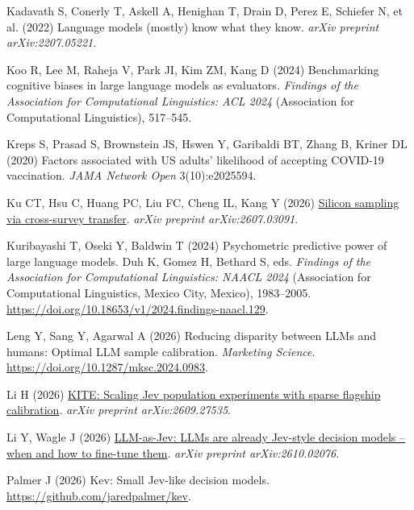 \documentclass[
  letterpaper,
  DIV=11,
  numbers=noendperiod]{scrartcl}
\newlength{\cslhangindent}
\newenvironment{CSLReferences}[2] %
 {\begin{list}{}{%
  \setlength{\itemindent}{0pt}
  \setlength{\leftmargin}{0pt}
  \setlength{\parsep}{0pt}
  \ifodd #1
   \setlength{\leftmargin}{\cslhangindent}
   \setlength{\itemindent}{-1\cslhangindent}
  \fi
  \setlength{\itemsep}{#2\baselineskip}}}
 {\end{list}}
\begin{document}
\begin{CSLReferences}{1}{0}
{Kadavath S, Conerly T, Askell A, Henighan T, Drain D, Perez E, Schiefer
N, et al.} (2022) Language models (mostly) know what they know.
\emph{arXiv preprint arXiv:2207.05221}.

Koo R, Lee M, Raheja V, Park JI, Kim ZM, Kang D (2024) Benchmarking
cognitive biases in large language models as evaluators. \emph{Findings
of the {Association for Computational Linguistics}: {ACL} 2024}
(Association for Computational Linguistics), 517--545.

Kreps S, Prasad S, Brownstein JS, Hswen Y, Garibaldi BT, Zhang B, Kriner
DL (2020) Factors associated with {US} adults' likelihood of accepting
COVID-19 vaccination. \emph{JAMA Network Open} 3(10):e2025594.

Ku CT, Hsu C, Huang PC, Liu FC, Cheng IL, Kang Y (2026)
\href{https://arxiv.org/abs/2607.03091}{Silicon sampling via
cross-survey transfer}. \emph{arXiv preprint arXiv:2607.03091}.

Kuribayashi T, Oseki Y, Baldwin T (2024) Psychometric predictive power
of large language models. Duh K, Gomez H, Bethard S, eds. \emph{Findings
of the {Association for Computational Linguistics}: {NAACL} 2024}
(Association for Computational Linguistics, Mexico City, Mexico),
1983--2005. \url{https://doi.org/10.18653/v1/2024.findings-naacl.129}.

Leng Y, Sang Y, Agarwal A (2026) Reducing disparity between {LLM}s and
humans: Optimal {LLM} sample calibration. \emph{Marketing Science}.
\url{https://doi.org/10.1287/mksc.2024.0983}.

Li H (2026) \href{https://arxiv.org/abs/2609.27535}{{KITE}: Scaling
{Jev} population experiments with sparse flagship calibration}.
\emph{arXiv preprint arXiv:2609.27535}.

Li Y, Wagle J (2026)
\href{https://arxiv.org/abs/2610.02076}{{LLM-as-Jev}: {LLMs} are already
{Jev}-style decision models -- when and how to fine-tune them}.
\emph{arXiv preprint arXiv:2610.02076}.

Palmer J (2026) Kev: Small {Jev}-like decision models.
\url{https://github.com/jaredpalmer/kev}.


\end{CSLReferences}
\end{document}
